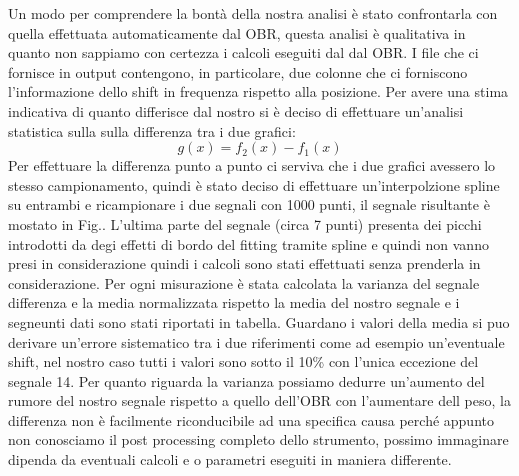 Un modo per comprendere la bontà della nostra analisi è stato confrontarla con quella effettuata automaticamente dal OBR, questa analisi è qualitativa in quanto non sappiamo con certezza i calcoli eseguiti dal dal OBR. I file che ci fornisce in output contengono, in particolare, due colonne che ci forniscono l'informazione dello shift in frequenza rispetto alla posizione. Per avere una stima indicativa di quanto differisce dal nostro si è deciso di effettuare un'analisi statistica sulla sulla differenza tra i due grafici:
$$g(x) = f_2(x) - f_1(x)$$
Per effettuare la differenza punto a punto ci serviva che i due grafici avessero lo stesso campionamento, quindi è stato deciso di effettuare un'interpolzione spline su entrambi e ricampionare i due segnali con 1000 punti, il segnale risultante è mostato in Fig..
L'ultima parte del segnale (circa 7 punti) presenta dei picchi introdotti da degi effetti di bordo del fitting tramite spline e quindi non vanno presi in considerazione quindi i calcoli sono stati effettuati senza prenderla in considerazione.
Per ogni misurazione è stata calcolata la varianza del segnale differenza e la media normalizzata rispetto la media del nostro segnale e i segneunti dati sono stati riportati in tabella. Guardano i valori della media si puo derivare un'errore sistematico tra i due riferimenti come ad esempio un'eventuale shift, nel nostro caso tutti i valori sono sotto il 10\% con l'unica eccezione del segnale 14. Per quanto riguarda la varianza possiamo dedurre un'aumento del rumore del nostro segnale rispetto a quello dell'OBR con l'aumentare dell peso, la differenza non è facilmente riconducibile ad una specifica causa perché appunto non conosciamo il post processing completo dello strumento, possimo immaginare dipenda da eventuali calcoli e o parametri eseguiti in maniera differente.


